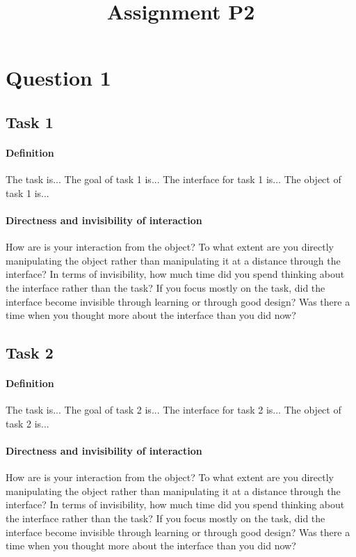 

\title{Assignment P2\\}



\maketitle
\thispagestyle{fancy}

\section{Question 1}

\subsection{Task 1}

\paragraph{Definition}
The task is... The goal of task 1 is... The interface for task 1 is... The object of task 1 is...

\paragraph{Directness and invisibility of interaction}
How are is your interaction from the object? To what extent are you directly manipulating the object rather than manipulating it at a distance through the interface? In terms of invisibility, how much time did you spend thinking about the interface rather than the task? If you focus mostly on the task, did the interface become invisible through learning or through good design? Was there a time when you thought more about the interface than you did now?

\subsection{Task 2}

\paragraph{Definition}
The task is... The goal of task 2 is... The interface for task 2 is... The object of task 2 is...

\paragraph{Directness and invisibility of interaction}
How are is your interaction from the object? To what extent are you directly manipulating the object rather than manipulating it at a distance through the interface? In terms of invisibility, how much time did you spend thinking about the interface rather than the task? If you focus mostly on the task, did the interface become invisible through learning or through good design? Was there a time when you thought more about the interface than you did now?

